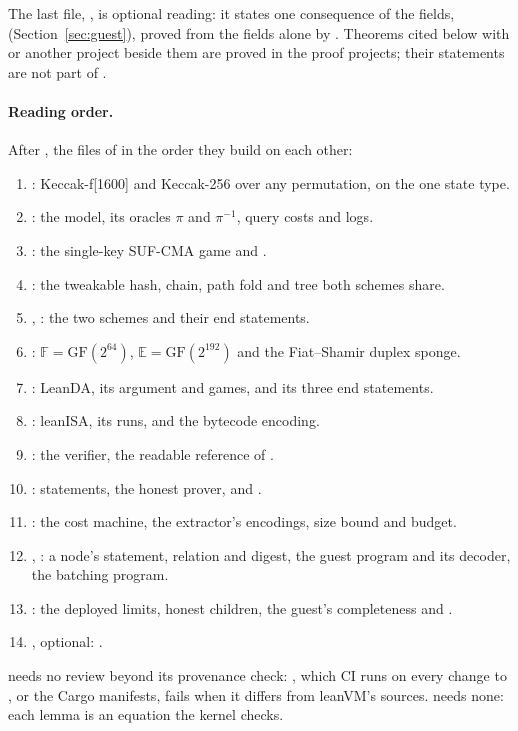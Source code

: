 \documentclass[11pt]{article}
\begin{document}
The last file, , is optional reading: it states one
consequence of the fields,  (Section~\ref{sec:guest}), proved from the
fields alone by
. Theorems cited below with  or another
project beside them are proved in the proof projects; their statements are not part of
.

\paragraph{Reading order.} After , the files of  in the order they build on each other:
\begin{enumerate}\itemsep0pt
\item {}: Keccak-f[1600] and Keccak-256 over any permutation, on the one state type.
\item {}: the model, its oracles $\pi$ and $\pi^{-1}$, query costs and logs.
\item {}: the single-key SUF-CMA game and .
\item {}: the tweakable hash, chain, path fold and tree both schemes share.
\item {}, : the two schemes and their end statements.
\item {}: $\mathbb{F} = \mathrm{GF}(2^{64})$, $\mathbb{E} = \mathrm{GF}(2^{192})$ and the Fiat--Shamir duplex sponge.
\item {}: LeanDA, its argument and games, and its three end statements.
\item {}: leanISA, its runs,  and the bytecode encoding.
\item {}: the verifier, the readable reference of .
\item {}: statements, the honest prover,  and .
\item {}: the cost machine, the extractor's encodings, size bound and budget.
\item {}, : a node's statement, relation and digest, the guest program and its decoder, the batching program.
\item {}: the deployed limits, honest children, the guest's completeness and .
\item {}, optional: .
\end{enumerate}
 needs no review beyond its provenance check: , which CI runs on every change to ,  or the Cargo manifests, fails when it differs from leanVM's sources.  needs none: each  lemma is an equation the kernel checks.
\end{document}
